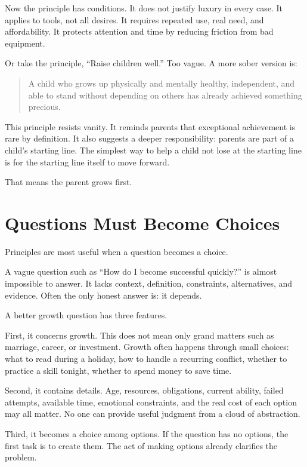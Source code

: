 Now the principle has conditions. It does not justify luxury in every case. It applies to tools, not all desires. It requires repeated use, real need, and affordability. It protects attention and time by reducing friction from bad equipment.

Or take the principle, ``Raise children well.'' Too vague. A more sober version is:

\begin{quote}
A child who grows up physically and mentally healthy, independent, and able to stand without depending on others has already achieved something precious.
\end{quote}

This principle resists vanity. It reminds parents that exceptional achievement is rare by definition. It also suggests a deeper responsibility: parents are part of a child's starting line. The simplest way to help a child not lose at the starting line is for the starting line itself to move forward.

That means the parent grows first.

\section*{Questions Must Become Choices}

Principles are most useful when a question becomes a choice.

A vague question such as ``How do I become successful quickly?'' is almost impossible to answer. It lacks context, definition, constraints, alternatives, and evidence. Often the only honest answer is: it depends.

A better growth question has three features.

First, it concerns growth. This does not mean only grand matters such as marriage, career, or investment. Growth often happens through small choices: what to read during a holiday, how to handle a recurring conflict, whether to practice a skill tonight, whether to spend money to save time.

Second, it contains details. Age, resources, obligations, current ability, failed attempts, available time, emotional constraints, and the real cost of each option may all matter. No one can provide useful judgment from a cloud of abstraction.

Third, it becomes a choice among options. If the question has no options, the first task is to create them. The act of making options already clarifies the problem.

